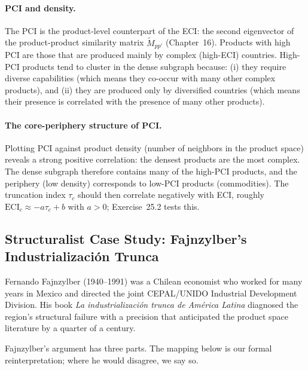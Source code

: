\documentclass[../structural_economics_book.tex]{subfiles}
\begin{document}
\paragraph{PCI and density.} The PCI is the product-level counterpart of the ECI: the second eigenvector of the product-product similarity matrix $\tilde{M}_{pp'}$ (Chapter~16). Products with high PCI are those that are produced mainly by complex (high-ECI) countries. High-PCI products tend to cluster in the dense subgraph because: (i) they require diverse capabilities (which means they co-occur with many other complex products), and (ii) they are produced only by diversified countries (which means their presence is correlated with the presence of many other products).

\paragraph{The core-periphery structure of PCI.} Plotting PCI against product density (number of neighbors in the product space) reveals a strong positive correlation: the densest products are the most complex. The dense subgraph therefore contains many of the high-PCI products, and the periphery (low density) corresponds to low-PCI products (commodities). The truncation index $\tau_c$ should then correlate negatively with ECI, roughly $\text{ECI}_c \approx -a\tau_c + b$ with $a > 0$; Exercise~25.2 tests this.


\subsection*{Structuralist Case Study: Fajnzylber's Industrializaci\'{o}n Trunca}

Fernando Fajnzylber (1940--1991) was a Chilean economist who worked for many years in Mexico and directed the joint CEPAL/UNIDO Industrial Development Division. His \citeyear{fajnzylber1983industrializacion} book \textit{La industrializaci\'{o}n trunca de Am\'{e}rica Latina} diagnosed the region's structural failure with a precision that anticipated the product space literature by a quarter of a century.

Fajnzylber's argument has three parts. The mapping below is our formal reinterpretation; where he would disagree, we say so.
\end{document}
